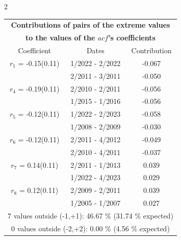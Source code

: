 
\thispagestyle{empty}
\begin{multicols}{2}{ 
\begin{tabular}{ccc}
\multicolumn{3}{c}{\textbf{Contributions of pairs of the extreme values} }  \vspace{-.10in}  \\ 
\multicolumn{3}{c}{ \textbf{to the values of the $acf$'s coefficients}} \\ 
\hline 
\hline                  Coefficient  &  Dates &  Contribution \\ 
\hline 
  $r_{ 1}$ = -0.15(0.11) &       1/2022 -  2/2022 &       -0.067    \vspace{-.10in} \\ 
  &        2/2011 -  3/2011 &       -0.050  \vspace{-.02in}   \\ \hline 
    $r_{ 4}$ = -0.19(0.11) &       2/2010 -  2/2011 &       -0.056    \vspace{-.10in} \\ 
  &        1/2015 -  1/2016 &       -0.056  \vspace{-.02in}   \\ \hline 
    $r_{ 5}$ = -0.12(0.11) &       1/2022 -  2/2023 &       -0.058    \vspace{-.10in} \\ 
  &        1/2008 -  2/2009 &       -0.030  \vspace{-.02in}   \\ \hline 
    $r_{ 6}$ = -0.12(0.11) &       2/2011 -  4/2012 &       -0.049    \vspace{-.10in} \\ 
  &        2/2010 -  4/2011 &       -0.037  \vspace{-.02in}   \\ \hline 
    $r_{ 7}$ = 0.14(0.11) &       2/2011 -  1/2013 &        0.039   \vspace{-.10in} \\  
&        1/2022 -  4/2023 &        0.029  \vspace{-.02in} \\ \hline 
  $r_{ 8}$ = 0.12(0.11) &       2/2009 -  2/2011 &        0.039   \vspace{-.10in} \\  
&        1/2005 -  1/2007 &        0.027  \vspace{-.02in} \\ \hline 
\multicolumn{3}{c}{               7 values outside (-1,+1): 46.67  \% (31.74  \% expected)}\vspace{-.10in} \\ 
\multicolumn{3}{c}{               0 values outside (-2,+2):  0.00 \%  (4.56 \% expected) } \\
 \end{tabular} \\ 
 } 
\end{multicols} 
